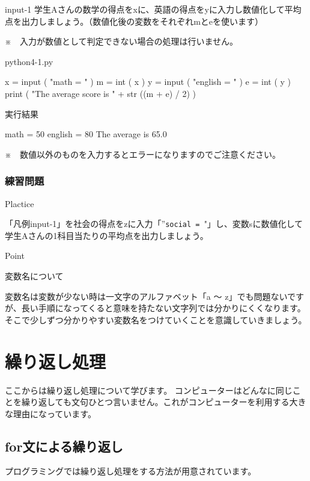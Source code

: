 \documentclass[11pt,a4paper,dvipdfmx,titlepage]{jsreport}
\begin{document}
\begin{pabox}{input-1}
学生Aさんの数学の得点をxに、英語の得点をyに入力し数値化して平均点を出力しましょう。（数値化後の変数をそれぞれmとeを使います）


※　入力が数値として判定できない場合の処理は行いません。
\begin{legbox}{python4-1.py}
\begin{listing}{1}
x = input ( "math = " )
m = int ( x ) 
y = input ( "english = " )
e = int ( y )
print ( "The average score is " + str ((m + e) / 2) )
\end{listing}
実行結果
\begin{listing}{1}
math = 50
english = 80
The average is 65.0
\end{listing}
\end{legbox}


※　数値以外のものを入力するとエラーになりますのでご注意ください。
\end{pabox}

\subsubsection{練習問題}
\begin{plabox}{Plactice}

「凡例input-1」を社会の得点をzに入力「”{\tt social = }"」し、変数sに数値化して学生Aさんの1科目当たりの平均点を出力しましょう。


\end{plabox}

\begin{hipoint}{Point}

変数名について

変数名は変数が少ない時は一文字のアルファベット「a ～ z」でも問題ないですが、長い手順になってくると意味を持たない文字列では分かりにくくなります。
そこで少しずつ分かりやすい変数名をつけていくことを意識していきましょう。
\end{hipoint}
\newpage
\section{繰り返し処理}
ここからは繰り返し処理について学びます。
コンピューターはどんなに同じことを繰り返しても文句ひとつ言いません。これがコンピューターを利用する大きな理由になっています。

\subsection{for文による繰り返し}
プログラミングでは繰り返し処理をする方法が用意されています。
\end{document}
